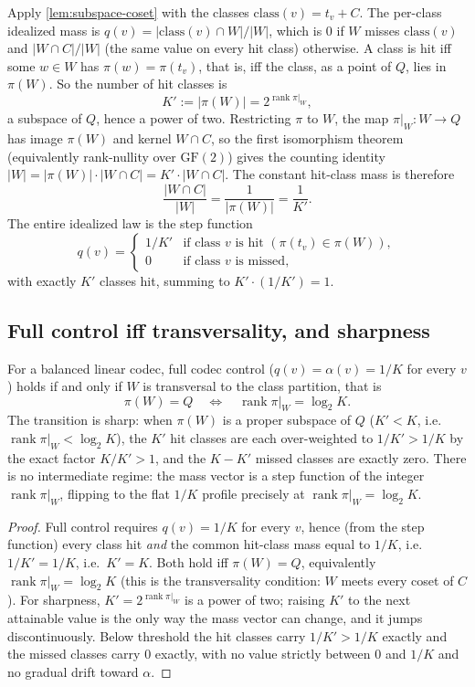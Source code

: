 \documentclass[acmsmall,review]{acmart}
\newcommand{\GF}{\mathrm{GF}(2)}
\newcommand{\class}{\mathrm{class}}
\DeclareMathOperator{\rank}{rank}
\newcommand{\W}{W}                          %
\newcommand{\proj}{\pi}                     %
\newcommand{\Quot}{Q}                       %
\newcommand{\al}{\alpha}                    %
\newcommand{\inter}{\cap}
\begin{document}
Apply \cref{lem:subspace-coset} with the classes $\class(v) = t_v + C$. The per-class
idealized mass is $q(v) = |\class(v) \inter \W| / |\W|$, which is $0$ if $\W$ misses
$\class(v)$ and $|\W \inter C| / |\W|$ (the same value on every hit class) otherwise. A
class is hit iff some $w \in \W$ has $\proj(w) = \proj(t_v)$, that is, iff the class,
as a point of $\Quot$, lies in $\proj(\W)$. So the number of hit classes is
\[
  K' := |\proj(\W)| = 2^{\rank \proj|_{\W}},
\]
a subspace of $\Quot$, hence a power of two. Restricting $\proj$ to $\W$, the map
$\proj|_{\W} : \W \to \Quot$ has image $\proj(\W)$ and kernel $\W \inter C$, so the
first isomorphism theorem (equivalently rank-nullity over $\GF$) gives the counting
identity $|\W| = |\proj(\W)| \cdot |\W \inter C| = K' \cdot |\W \inter C|$. The constant
hit-class mass is therefore
\[
  \frac{|\W \inter C|}{|\W|} = \frac{1}{|\proj(\W)|} = \frac{1}{K'}.
\]
The entire idealized law is the step function
\[
  q(v) =
  \begin{cases}
    1/K' & \text{if class } v \text{ is hit } (\proj(t_v) \in \proj(\W)), \\
    0 & \text{if class } v \text{ is missed},
  \end{cases}
\]
with exactly $K'$ classes hit, summing to $K' \cdot (1/K') = 1$.

\subsection{Full control iff transversality, and sharpness}

\begin{theorem}
\label{thm:threshold}
For a balanced linear codec, full codec control ($q(v) = \al(v) = 1/K$ for every $v$)
holds if and only if $\W$ is transversal to the class partition, that is
\[
  \proj(\W) = \Quot \quad\Longleftrightarrow\quad \rank \proj|_{\W} = \log_2 K.
\]
The transition is sharp: when $\proj(\W)$ is a proper subspace of $\Quot$ ($K' < K$,
i.e.\ $\rank \proj|_{\W} < \log_2 K$), the $K'$ hit classes are each over-weighted to
$1/K' > 1/K$ by the exact factor $K/K' > 1$, and the $K - K'$ missed classes are
exactly zero. There is no intermediate regime: the mass vector is a step function of
the integer $\rank \proj|_{\W}$, flipping to the flat $1/K$ profile precisely at
$\rank \proj|_{\W} = \log_2 K$.
\end{theorem}

\begin{proof}
Full control requires $q(v) = 1/K$ for every $v$, hence (from the step function) every
class hit \emph{and} the common hit-class mass equal to $1/K$, i.e.\ $1/K' = 1/K$, i.e.\
$K' = K$. Both hold iff $\proj(\W) = \Quot$, equivalently $\rank \proj|_{\W} = \log_2 K$
(this is the transversality condition: $\W$ meets every coset of $C$). For sharpness,
$K' = 2^{\rank \proj|_{\W}}$ is a power of two; raising $K'$ to the next attainable
value is the only way the mass vector can change, and it jumps discontinuously. Below
threshold the hit classes carry $1/K' > 1/K$ exactly and the missed classes carry $0$
exactly, with no value strictly between $0$ and $1/K$ and no gradual drift toward
$\al$.
\end{proof}
\end{document}
